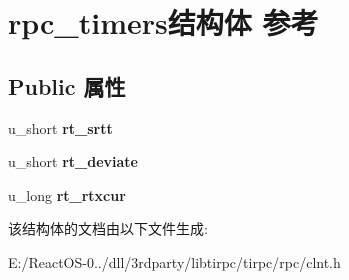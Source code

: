 \hypertarget{structrpc__timers}{}\section{rpc\+\_\+timers结构体 参考}
\label{structrpc__timers}
\subsection*{Public 属性}
\begin{DoxyCompactItemize}
\item 
\mbox{\label{structrpc__timers_ac170a4e6134efba0b31ff480d9bebb8c}} 
u\+\_\+short {\bfseries rt\+\_\+srtt}
\item 
\mbox{\label{structrpc__timers_afae11000ea169641afe24faa4fcb86a3}} 
u\+\_\+short {\bfseries rt\+\_\+deviate}
\item 
\mbox{\label{structrpc__timers_acd7ecd2ead240eb8c48f0d70dd224e9e}} 
u\+\_\+long {\bfseries rt\+\_\+rtxcur}
\end{DoxyCompactItemize}


该结构体的文档由以下文件生成\+:\begin{DoxyCompactItemize}
\item 
E\+:/\+React\+O\+S-\/0../dll/3rdparty/libtirpc/tirpc/rpc/clnt.\+h\end{DoxyCompactItemize}
